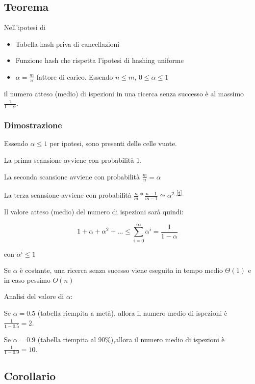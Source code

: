 \documentclass[tikz]{article}
\providecommand{\tightlist}{%
  \setlength{\itemsep}{0pt}\setlength{\parskip}{0pt}}
\begin{document}
\subsection{Teorema}

{Nell'ipotesi di}

\begin{itemize}
\tightlist
\item
  {Tabella hash priva di cancellazioni}
\item
  {Funzione hash che rispetta l'ipotesi di hashing uniforme}
\item
  {$\alpha = \frac{m}{n}$ fattore di carico. Essendo $n \leq m$, $0 \leq \alpha \leq 1$}
\end{itemize}

{il numero atteso (medio) di ispezioni in una ricerca senza successo è al massimo $\frac{1}{1-\alpha}$.}

\subsubsection{Dimostrazione}

{Essendo $\alpha \leq 1$ per ipotesi, sono presenti delle celle vuote.}

{La prima scansione avviene con probabilità 1.}

{La seconda scansione avviene con probabilità $\frac{m}{n} = \alpha$}

{La terza scansione avviene con probabilità $\frac{n}{m} * \frac{n-1}{m-1} \simeq \alpha^2 $}
\textsuperscript{\protect\hyperlink{cmnt20}{{[}t{]}}}

{Il valore atteso (medio) del numero di ispezioni sarà quindi:}

\begin{equation}
1+\alpha+\alpha^2+\ldots \leq \sum_{i=0}^{\infty}{\alpha^i} = \frac{1}{1-\alpha}
\end{equation}

{con $\alpha^i\leq1$}

{Se $\alpha$ è costante, una ricerca senza sucesso viene eseguita in tempo medio $\Theta(1)$ e in caso pessimo $O(n)$}

{Analisi del valore di $\alpha$:}

{Se $\alpha=0.5$ (tabella riempita a metà), allora il numero medio di ispezioni è $\frac{1}{1-0.5}=2$.}

{Se $\alpha=0.9$ (tabella riempita al 90\%),allora il numero medio di ispezioni è $\frac{1}{1-0.9}=10$.}

\subsection{Corollario}
\end{document}
